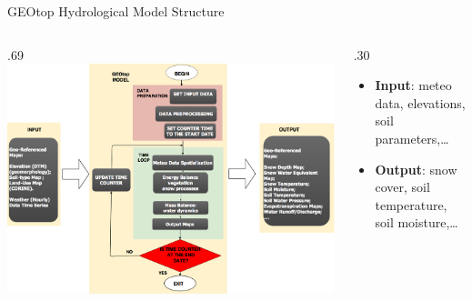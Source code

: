 \documentclass[ignorenonframetext,]{beamer}
\def\begincols{\begin{columns}}
\def\begincol{\begin{column}}
\def\endcol{\end{column}}
\def\endcols{\end{columns}}
\begin{document}
\begin{frame}{GEOtop Hydrological Model Structure}

\begincols

\begincol{.69\textwidth}
\includegraphics[width=1.00000\textwidth]{resources/images/geotop_revised.png}\\
\endcol

\begincol{.30\textwidth}

\begin{itemize}
\item
  \textbf{Input}: meteo data, elevations, soil parameters,\ldots{}
\item
  \textbf{Output}: snow cover, soil temperature, soil moisture,\ldots{}
\end{itemize}

\endcol
\endcols

\end{frame}
\end{document}
